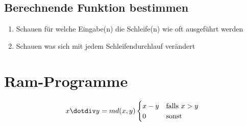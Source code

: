 \documentclass[14pt]{article}
\begin{document}
    \subsection{Berechnende Funktion bestimmen}
    \begin{enumerate}
        \item Schauen für welche Eingabe(n) die Schleife(n) wie oft 
        ausgeführt werden
        \item Schauen was sich mit jedem Schleifendurchlauf verändert
    \end{enumerate}


    \section{Ram-Programme}
    \begin{definition}
        \begin{equation*}
            x \dotdiv y =  md(x, y)
            \begin{cases}
                x - y & \text{falls $x > y$} \\
                0 & \text{sonst}
            \end{cases}
        \end{equation*}
    \end{definition}
\end{document}
